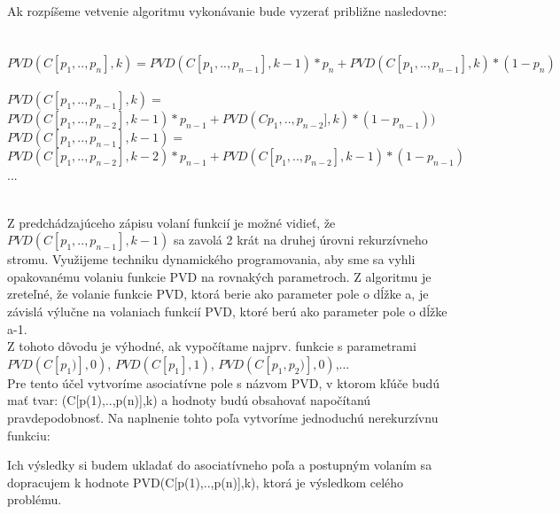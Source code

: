 \documentclass[paper=a4, fontsize=11pt]{scrartcl} %
\numberwithin{equation}{section} %
\numberwithin{figure}{section} %
\numberwithin{table}{section} %
\begin{document}
Ak rozpíšeme vetvenie algoritmu vykonávanie bude vyzerať približne nasledovne: \ \\ \ \\
$PVD(C[{p}_1,..,{p}_n],k) = PVD(C[{p}_1,..,{p}_{n-1}],k-1)*{p}_n + PVD(C[{p}_1,..,{p}_{n-1}],k)*(1-{p}_n)$ \ \\

$PVD(C[{p}_1,..,{p}_{n-1}],k) = $ \ \\
	$         PVD(C[{p}_1,..,{p}_{n-2}],k-1)*{p}_{n-1} + PVD(C{p}_1,..,{p}_{n-2}],k)*(1-{p}_{n-1}))$ \ \\

$PVD(C[{p}_1,..,{p}_{n-1}],k-1) = $ \\ 
	$         PVD(C[{p}_1,..,{p}_{n-2}],k-2)*{p}_{n-1} + PVD(C[{p}_1,..,{p}_{n-2}],k-1)*(1-{p}_{n-1})$
...

\ \\ 

Z predchádzajúceho zápisu volaní funkcií je možné vidieť, že $PVD(C[{p}_1,..,{p}_{n-1}],k-1) $ sa zavolá 2 krát na druhej úrovni rekurzívneho stromu.
Využijeme techniku dynamického programovania, aby sme sa vyhli opakovanému volaniu funkcie PVD na rovnakých parametroch.
Z algoritmu je zreteľné, že volanie funkcie PVD, ktorá berie ako parameter pole o dĺžke a, je závislá výlučne na volaniach funkcií PVD, ktoré berú ako parameter pole o dĺžke a-1. \ \\

Z tohoto dôvodu je výhodné, ak vypočítame najprv. funkcie s parametrami $PVD(C[{p}_{1})],0)$, $PVD(C[{p}_{1}],1)$, $PVD(C[p_1,p_2)],0)$,... \ \\
 

Pre tento účel vytvoríme asociatívne pole s názvom PVD, v ktorom kľúče budú mať tvar:
(C[p(1),..,p(n)],k)
a hodnoty budú obsahovať napočítanú pravdepodobnosť.
Na naplnenie tohto poľa vytvoríme jednoduchú nerekurzívnu funkciu:

Ich výsledky si budem ukladať do asociatívneho poľa a postupným volaním sa dopracujem k hodnote PVD(C[p(1),..,p(n)],k), ktorá je výsledkom celého problému. \ \\
\end{document}
